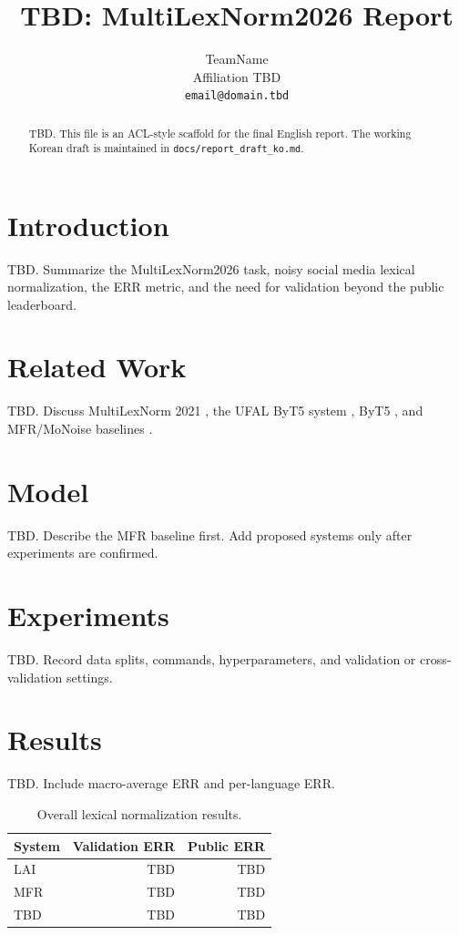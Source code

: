 \documentclass[11pt]{article}
\title{TBD: MultiLexNorm2026 Report}
\author{
  TeamName \\
  Affiliation TBD \\
  \texttt{email@domain.tbd}
}
\begin{document}
\maketitle

\begin{abstract}
TBD. This file is an ACL-style scaffold for the final English report.
The working Korean draft is maintained in \texttt{docs/report\_draft\_ko.md}.
\end{abstract}

\section{Introduction}

TBD. Summarize the MultiLexNorm2026 task, noisy social media lexical normalization, the ERR metric, and the need for validation beyond the public leaderboard.

\section{Related Work}

TBD. Discuss MultiLexNorm 2021 \citep{van-der-goot-etal-2021-multilexnorm}, the UFAL ByT5 system \citep{samuel-straka-2021-ufal}, ByT5 \citep{xue-etal-2022-byt5}, and MFR/MoNoise baselines \citep{van-der-goot-2019-monoise,van-der-goot-2021-cl}.

\section{Model}

TBD. Describe the MFR baseline first. Add proposed systems only after experiments are confirmed.

\section{Experiments}

TBD. Record data splits, commands, hyperparameters, and validation or cross-validation settings.

\section{Results}

TBD. Include macro-average ERR and per-language ERR.

\begin{table}[t]
  \centering
  \begin{tabular}{lrr}
    \toprule
    System & Validation ERR & Public ERR \\
    \midrule
    LAI & TBD & TBD \\
    MFR & TBD & TBD \\
    TBD & TBD & TBD \\
    \bottomrule
  \end{tabular}
  \caption{Overall lexical normalization results.}
  \label{tab:overall-results}
\end{table}
\end{document}
